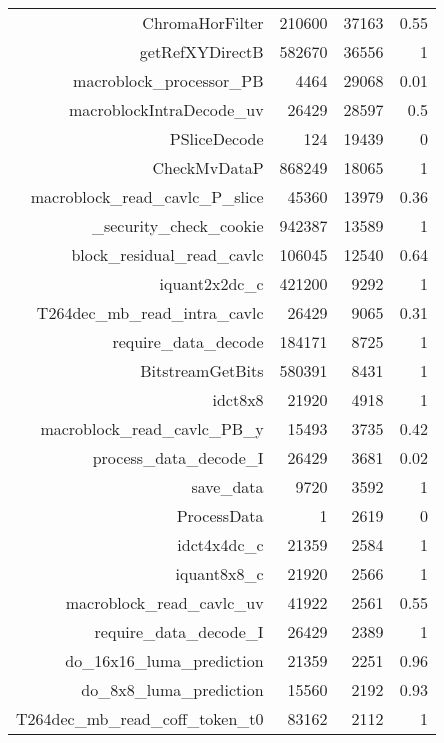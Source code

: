 \begin{table}[htbp]
\begin{tabular}{rrrr}
    ChromaHorFilter & 210600 & 37163 & 0.55 \\
    getRefXYDirectB & 582670 & 36556 & 1 \\
    macroblock\_processor\_PB & 4464  & 29068 & 0.01 \\
    macroblockIntraDecode\_uv & 26429 & 28597 & 0.5 \\
    PSliceDecode & 124   & 19439 & 0 \\
    CheckMvDataP & 868249 & 18065 & 1 \\
    macroblock\_read\_cavlc\_P\_slice & 45360 & 13979 & 0.36 \\
    \_security\_check\_cookie & 942387 & 13589 & 1 \\
    block\_residual\_read\_cavlc & 106045 & 12540 & 0.64 \\
    iquant2x2dc\_c & 421200 & 9292  & 1 \\
    T264dec\_mb\_read\_intra\_cavlc & 26429 & 9065  & 0.31 \\
    require\_data\_decode & 184171 & 8725  & 1 \\
    BitstreamGetBits & 580391 & 8431  & 1 \\
    idct8x8 & 21920 & 4918  & 1 \\
    macroblock\_read\_cavlc\_PB\_y & 15493 & 3735  & 0.42 \\
    process\_data\_decode\_I & 26429 & 3681  & 0.02 \\
    save\_data & 9720  & 3592  & 1 \\
    ProcessData & 1     & 2619  & 0 \\
    idct4x4dc\_c & 21359 & 2584  & 1 \\
    iquant8x8\_c & 21920 & 2566  & 1 \\
    macroblock\_read\_cavlc\_uv & 41922 & 2561  & 0.55 \\
    require\_data\_decode\_I & 26429 & 2389  & 1 \\
    do\_16x16\_luma\_prediction & 21359 & 2251  & 0.96 \\
    do\_8x8\_luma\_prediction & 15560 & 2192  & 0.93 \\
    T264dec\_mb\_read\_coff\_token\_t0 & 83162 & 2112  & 1 \\
    \bottomrule
    \end{tabular}
  \label{tab:addlabel}
\end{table}
